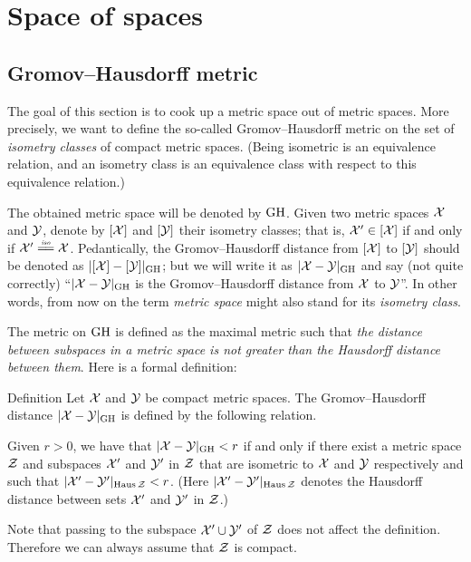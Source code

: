 \chapter{Space of spaces}

\section{Gromov--Hausdorff metric}

The goal of this section is to cook up a metric space out of metric spaces.
More precisely, we want to define the so-called  Gromov--Hausdorff metric on the set of {}\emph{isometry classes} of compact metric spaces.
(Being isometric is an equivalence relation, 
and an isometry class is an equivalence class with respect to this equivalence relation.)

The obtained metric space will be denoted by $\operatorname{\rm GH}\nolimits$.
Given two metric spaces $\mathcal{X}$ and $\mathcal{Y}$,
denote by $[\mathcal{X}]$ and $[\mathcal{Y}]$ their isometry classes;
that is, $\mathcal{X}'\in [\mathcal{X}]$ if and only if $\spc{X}'\iso \spc{X}$.
Pedantically, the Gromov--Hausdorff distance from $[\mathcal{X}]$ 
to $[\mathcal{Y}]$ should be denoted as $|[\mathcal{X}]-[\mathcal{Y}]|_{\operatorname{\rm GH}\nolimits}$;
but we will write it as $|\spc{X}\z-\spc{Y}|_{\GH}$ and say (not quite correctly) 
``$|\spc{X}\z-\spc{Y}|_{\GH}$ is the Gromov--Hausdorff distance from  $\mathcal{X}$ 
to  $\mathcal{Y}$''.
In other words, from now on the term {}\emph{metric space} might also stand for its {}\emph{isometry class}.

The metric on $\operatorname{\rm GH}\nolimits$ is defined as the maximal metric such that \textit{the distance between subspaces in a metric space is not greater than the Hausdorff distance between them}.
Here is a formal definition:

\begin{thm}{Definition}\label{def:GH}
Let $\mathcal{X}$ and $\mathcal{Y}$ be compact metric spaces. 
The Gromov--Hausdorff distance $|\mathcal{X}-\mathcal{Y}|_{\operatorname{\rm GH}\nolimits}$ is defined by the following
relation.
 
Given  $r > 0$, we have that $|\mathcal{X}-\mathcal{Y}|_{\operatorname{\rm GH}\nolimits} < r$ if and only if there exist a metric
space $\mathcal{Z}$ and subspaces $\mathcal{X}'$ and $\mathcal{Y}'$ in $\mathcal{Z}$ that are isometric to $\mathcal{X}$ and $\mathcal{Y}$
respectively and such that $|\mathcal{X}'-\mathcal{Y}'|_{\operatorname{\rm Haus}\nolimits\mathcal{Z}} < r$. 
(Here $|\mathcal{X}'-\mathcal{Y}'|_{\operatorname{\rm Haus}\nolimits\mathcal{Z}}$ denotes the Hausdorff distance between sets $\mathcal{X}'$ and $\mathcal{Y}'$ in $\mathcal{Z}$.)
\end{thm}

Note that passing to the subspace $\mathcal{X}'\cup\mathcal{Y}'$ of $\mathcal{Z}$ does not affect the definition.
Therefore we can always assume that $\mathcal{Z}$ is compact.

